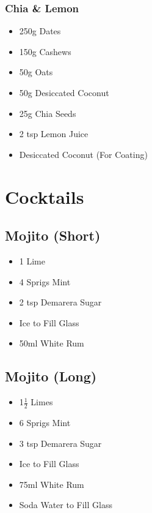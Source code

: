 \documentclass[11pt, english]{article}
\begin{document}
		\subsubsection*{Chia \& Lemon}

	\begin{itemize}
        \setlength\itemsep{0cm}
                \item 250g Dates
		\item 150g Cashews
		\item 50g Oats
		\item 50g Desiccated Coconut
		\item 25g Chia Seeds
		\item 2 tsp Lemon Juice
		\item Desiccated Coconut (For Coating)
        \end{itemize}

\newpage

\section{Cocktails}

	\subsection{Mojito (Short)}

	\begin{itemize}
        \setlength\itemsep{0cm}
                \item 1 Lime
		\item 4 Sprigs Mint
		\item 2 tsp Demarera Sugar
		\item Ice to Fill Glass
		\item 50ml White Rum
        \end{itemize}

	\subsection{Mojito (Long)}

	\begin{itemize}
        \setlength\itemsep{0cm}
		\item 1$\frac{1}{2}$ Limes
		\item 6 Sprigs Mint
		\item 3 tsp Demarera Sugar
		\item Ice to Fill Glass
		\item 75ml White Rum
		\item Soda Water to Fill Glass
        \end{itemize}
\end{document}
